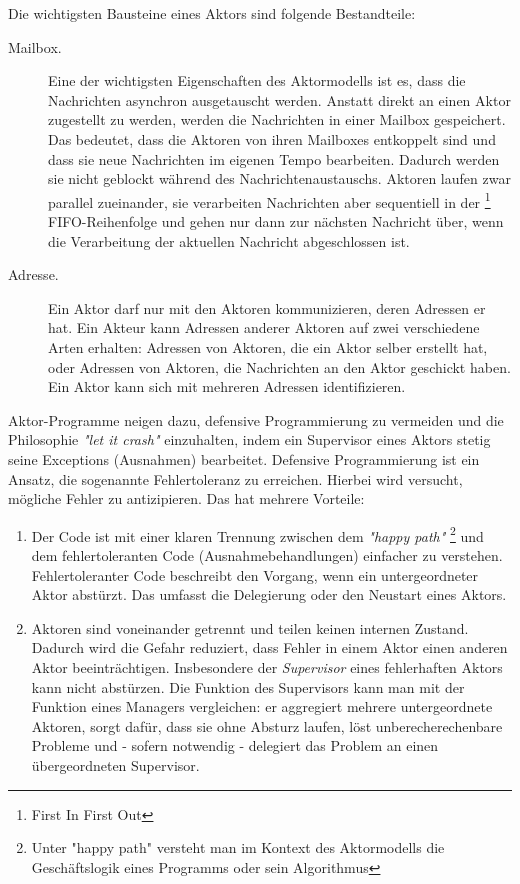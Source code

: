 \begin{description}
	Die wichtigsten Bausteine eines Aktors sind folgende Bestandteile:
	
	\begin{description} 
		\item[Mailbox.] Eine der wichtigsten Eigenschaften des Aktormodells ist es, dass die Nachrichten asynchron ausgetauscht werden. Anstatt direkt an einen Aktor zugestellt zu werden, werden die Nachrichten in einer Mailbox gespeichert. Das bedeutet, dass die Aktoren von ihren Mailboxes entkoppelt sind und dass sie neue Nachrichten im eigenen Tempo bearbeiten. Dadurch werden sie nicht geblockt während des Nachrichtenaustauschs. Aktoren laufen zwar parallel zueinander, sie verarbeiten Nachrichten aber sequentiell in der \footnote{First In First Out} FIFO-Reihenfolge und gehen nur dann zur nächsten Nachricht über, wenn die Verarbeitung der aktuellen Nachricht abgeschlossen ist.
		
		\item[Adresse.] Ein Aktor darf nur mit den Aktoren kommunizieren, deren Adressen er hat. Ein Akteur kann Adressen anderer Aktoren auf zwei verschiedene Arten erhalten: Adressen von Aktoren, die ein Aktor selber erstellt hat, oder Adressen von Aktoren, die Nachrichten an den Aktor geschickt haben. Ein Aktor kann sich mit mehreren Adressen identifizieren.
	\end{description}
	
	Aktor-Programme neigen dazu, defensive Programmierung zu vermeiden und die Philosophie \textit{"let it crash"} einzuhalten, indem ein Supervisor eines Aktors stetig seine Exceptions (Ausnahmen) bearbeitet. Defensive Programmierung ist ein Ansatz, die sogenannte Fehlertoleranz zu erreichen. Hierbei wird versucht, mögliche Fehler zu antizipieren. Das hat mehrere Vorteile:
	
	\begin{enumerate}
		\item Der Code ist mit einer klaren Trennung zwischen dem \textit{"happy path"} \footnote{Unter "happy path" versteht man im Kontext des Aktormodells die Geschäftslogik eines Programms oder sein Algorithmus} und dem fehlertoleranten Code (Ausnahmebehandlungen) einfacher zu verstehen. Fehlertoleranter Code beschreibt den Vorgang, wenn ein untergeordneter Aktor abstürzt. Das umfasst die Delegierung oder den Neustart eines Aktors.
		
		\item Aktoren sind voneinander getrennt und teilen keinen internen Zustand. Dadurch wird die Gefahr reduziert, dass Fehler in einem Aktor einen anderen Aktor beeinträchtigen. Insbesondere der \textit{Supervisor} eines fehlerhaften Aktors kann nicht abstürzen. Die Funktion des Supervisors kann man mit der Funktion eines Managers vergleichen: er aggregiert mehrere untergeordnete Aktoren, sorgt dafür, dass sie ohne Absturz laufen, löst unberecherechenbare Probleme und - sofern notwendig -  delegiert das Problem an einen übergeordneten Supervisor.
	\end{enumerate}


\end{description}
